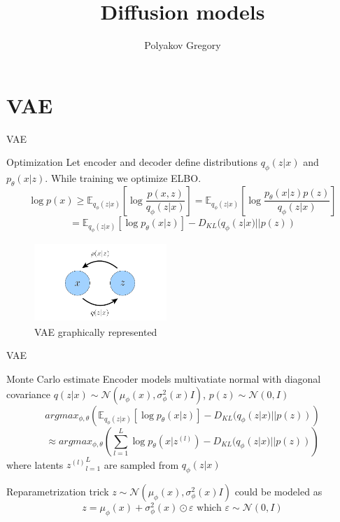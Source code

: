 \documentclass{beamer}
\title{Diffusion models}
\author{Polyakov Gregory}
\institute{MIPT, 2022}
\begin{document}
\begin{frame}
    \titlepage
\end{frame}


\begin{frame}
    \tableofcontents
\end{frame}


\section{VAE}

\begin{frame}{VAE}
    \begin{block}{Optimization}
    Let encoder and decoder define distributions $q_{\phi}(z|x)$ and $p_{\theta}(x|z)$. While training we optimize ELBO.
    \begin{equation}
        \label{vae_elbo_1}
        \log p(x) \geq \mathbb{E}_{q_{\phi}(z|x)} \left[ \log \dfrac{p(x, z)}{q_{\phi}(z|x)}\right] = \mathbb{E}_{q_{\phi}(z|x)} \left[ \log \dfrac{p_{\theta}(x|z)p(z)}{q_{\phi}(z|x)}\right]
    \end{equation}
    \begin{equation}
        \label{vae_elbo_2}
         = \mathbb{E}_{q_{\phi}(z|x)} \left[ \log p_{\theta}(x|z)\right] - D_{KL}(q_{\phi}(z|x) || p(z))
    \end{equation}
    \end{block}
    \begin{figure}[h]
        \centering
        \includegraphics[width=5cm, height=3cm]{diffusion_1.png}
    \caption{VAE graphically represented}
    \end{figure}

\end{frame}


\begin{frame}{VAE}
    \begin{block}{Monte Carlo estimate}
        Encoder models multivatiate normal with diagonal covariance $q(z|x) \sim \mathcal{N}(\mu_{\phi}(x), \sigma^2_{\phi}(x)I)$, $p(z) \sim \mathcal{N}(0, I)$ 
        \[argmax_{\phi, \theta} \left(\mathbb{E}_{q_{\phi}(z|x)}\left[\log p_{\theta}(x|z)\right]  - D_{KL}(q_{\phi}
        (z|x) || p(z))\right)\]
        \[\approx argmax_{\phi, \theta} \left(\sum_{l=1}^L\log p_{\theta}(x|z^{(l)})  - D_{KL}(q_{\phi}(z|x) || p(z))\right)\]
        where latents ${z^{(l)}}_{l=1}^L$ are sampled from $q_{\phi}(z|x)$
    \end{block}
    \begin{block}{Reparametrization trick}
    $z \sim \mathcal{N}(\mu_{\phi}(x), \sigma^2_{\phi}(x)I)$ could be modeled as 
    \[z = \mu_{\phi}(x) + \sigma^2_{\phi}(x) \odot \varepsilon \text{ which } \varepsilon \sim \mathcal{N}(0, I)\] 
    \end{block}
\end{frame}
\end{document}
